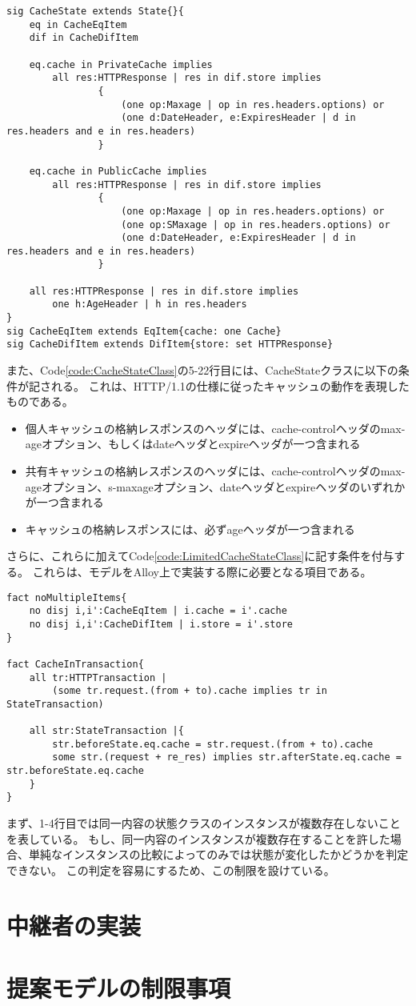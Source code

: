 \documentclass[12pt,a4paper]{jbook}
\begin{document}
\begin{lstlisting}[caption=キャッシュの状態を表すクラス, label=code:CacheStateClass]
sig CacheState extends State{}{
	eq in CacheEqItem
	dif in CacheDifItem

	eq.cache in PrivateCache implies
        all res:HTTPResponse | res in dif.store implies
                {
                    (one op:Maxage | op in res.headers.options) or
                    (one d:DateHeader, e:ExpiresHeader | d in res.headers and e in res.headers)
                }

    eq.cache in PublicCache implies
        all res:HTTPResponse | res in dif.store implies
                {
                    (one op:Maxage | op in res.headers.options) or
                    (one op:SMaxage | op in res.headers.options) or
                    (one d:DateHeader, e:ExpiresHeader | d in res.headers and e in res.headers)
                }

    all res:HTTPResponse | res in dif.store implies
        one h:AgeHeader | h in res.headers
}
sig CacheEqItem extends EqItem{cache: one Cache}
sig CacheDifItem extends DifItem{store: set HTTPResponse}
\end{lstlisting}

また、Code\ref{code:CacheStateClass}の5-22行目には、CacheStateクラスに以下の条件が記される。
これは、HTTP/1.1の仕様に従ったキャッシュの動作を表現したものである。
\begin{itemize}
\item 個人キャッシュの格納レスポンスのヘッダには、cache-controlヘッダのmax-ageオプション、もしくはdateヘッダとexpireヘッダが一つ含まれる
\item 共有キャッシュの格納レスポンスのヘッダには、cache-controlヘッダのmax-ageオプション、s-maxageオプション、dateヘッダとexpireヘッダのいずれかが一つ含まれる
\item キャッシュの格納レスポンスには、必ずageヘッダが一つ含まれる
\end{itemize}

さらに、これらに加えてCode\ref{code:LimitedCacheStateClass}に記す条件を付与する。
これらは、モデルをAlloy上で実装する際に必要となる項目である。
\begin{lstlisting}[caption=CacheStateクラスの制限, label=code:LimitedCacheStateClass]
fact noMultipleItems{
	no disj i,i':CacheEqItem | i.cache = i'.cache
	no disj i,i':CacheDifItem | i.store = i'.store
}

fact CacheInTransaction{
	all tr:HTTPTransaction |
		(some tr.request.(from + to).cache implies tr in StateTransaction)

	all str:StateTransaction |{
		str.beforeState.eq.cache = str.request.(from + to).cache
		some str.(request + re_res) implies str.afterState.eq.cache = str.beforeState.eq.cache
	}
}
\end{lstlisting}
まず、1-4行目では同一内容の状態クラスのインスタンスが複数存在しないことを表している。
もし、同一内容のインスタンスが複数存在することを許した場合、単純なインスタンスの比較によってのみでは状態が変化したかどうかを判定できない。
この判定を容易にするため、この制限を設けている。

\section{中継者の実装}
\section{提案モデルの制限事項}
\color{black}
\end{document}
